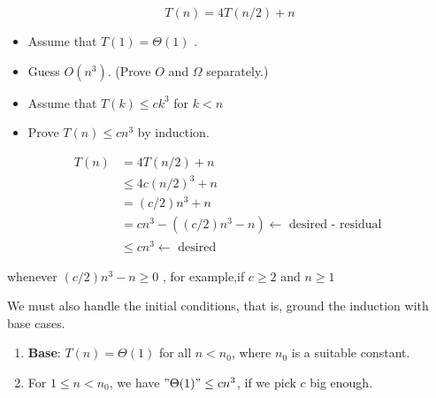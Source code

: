 \documentclass[11pt]{elegantbook}
\begin{document}
\begin{example}
  $$
T(n)=4 T(n / 2)+n
$$
\end{example}
\begin{itemize}
  \item Assume that $T(1)=\Theta(1)$ .
  \item Guess $O\left(n^{3}\right)$. (Prove $O$ and $\Omega$ separately.)
  \item Assume that $T(k) \leq c k^{3}$ for $k<n$
  \item Prove $T(n) \leq c n^{3}$ by induction. 
\end{itemize}
\begin{solution}
  $$
  \begin{aligned}
  T(n) &=4 T(n / 2)+n \\
  & \leq 4 c(n / 2)^{3}+n \\
  &=(c / 2) n^{3}+n \\
  &=c n^{3}-\left((c / 2) n^{3}-n\right) \leftarrow \text { desired - residual }\\
  & \leq c n^{3} \longleftarrow \text { desired }
  \end{aligned}
  $$

  whenever $(c / 2) n^{3}-n \geq 0$ , for example,if $c \geq 2$ and $n \geq 1$
\end{solution} 
\begin{note}
  We must also handle the initial conditions, that is, ground the induction with base cases.
\end{note}
\begin{enumerate}
  \item \textbf{Base}: $T(n)=\Theta(1)$ for all $n<n_{0}$, where $n_{0}$ is a suitable constant.
  \item For $1 \leq n<n_{0}$, we have  $" \Theta(1) " \leq c n^{3}$, if we pick $c$ big enough.
\end{enumerate}
\end{document}
